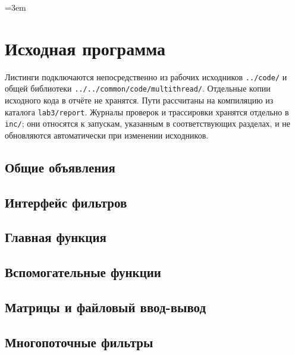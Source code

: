 \begingroup
\emergencystretch=3em
\section{Исходная программа}
Листинги подключаются непосредственно из рабочих исходников
\texttt{../code/} и общей библиотеки
\texttt{../../common/code/multithread/}.
Отдельные копии исходного кода в отчёте не хранятся.
Пути рассчитаны на компиляцию из каталога \texttt{lab3/report}.
Журналы проверок и трассировки хранятся отдельно в \texttt{inc/};
они относятся к запускам, указанным в соответствующих разделах,
и не обновляются автоматически при изменении исходников.

\subsection{Общие объявления}


\subsection{Интерфейс фильтров}


\subsection{Главная функция}


\subsection{Вспомогательные функции}


\subsection{Матрицы и файловый ввод-вывод}


\subsection{Многопоточные фильтры}


